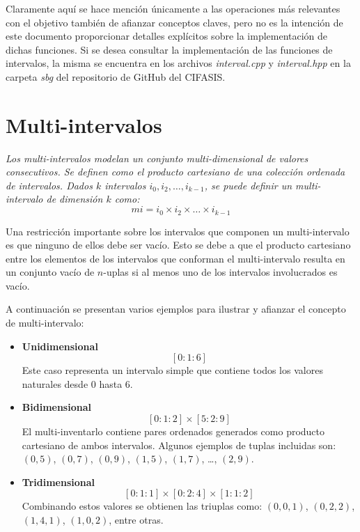 Claramente aquí se hace mención únicamente a las operaciones más relevantes con el objetivo también de afianzar conceptos claves, pero no es la intención de este documento proporcionar detalles explícitos sobre la implementación de dichas funciones. Si se desea consultar la implementación de las funciones de intervalos, la misma se encuentra en los archivos \textit{interval.cpp} y \textit{interval.hpp} en la carpeta \textit{sbg} del repositorio de GitHub del CIFASIS.

\section{Multi-intervalos}

\begin{center}
    {\itshape Los multi-intervalos modelan un conjunto multi-dimensional de valores consecutivos. Se definen como el producto cartesiano de una colección ordenada de intervalos. Dados $k$ intervalos $i_0, i_2, \ldots, i_{k-1}$, se puede definir un multi-intervalo de dimensión $k$ como:  
    \[
    mi = i_0 \times i_2 \times \ldots \times i_{k-1}
    \]}
\end{center}


Una restricción importante sobre los intervalos que componen un multi-intervalo es que ninguno de ellos debe ser vacío. Esto se debe a que el producto cartesiano entre los elementos de los intervalos que conforman el multi-intervalo resulta en un conjunto vacío de $n$-uplas si al menos uno de los intervalos involucrados es vacío.

A continuación se presentan varios ejemplos para ilustrar y afianzar el concepto de multi-intervalo:

\begin{itemize}
  \item \textbf{Unidimensional}
    \[
      [0:1:6]
    \]
    Este caso representa un intervalo simple que contiene todos los valores naturales desde \(0\) hasta \(6\).

  \item \textbf{Bidimensional}
    \[
      [0:1:2]\times[5:2:9]
    \]
    El multi-inventarlo contiene pares ordenados generados como producto cartesiano de ambos intervalos. Algunos ejemplos de tuplas incluidas son: \((0,5)\), \((0,7)\), \((0,9)\), \((1,5)\), \((1,7)\), \dots, \((2,9)\).

  \item \textbf{Tridimensional}
    \[
      [0:1:1]\times[0:2:4]\times[1:1:2]
    \]
    Combinando estos valores se obtienen las triuplas como: \((0,0,1)\), \((0,2,2)\), \((1,4,1)\), \((1,0,2)\), entre otras.
\end{itemize}

